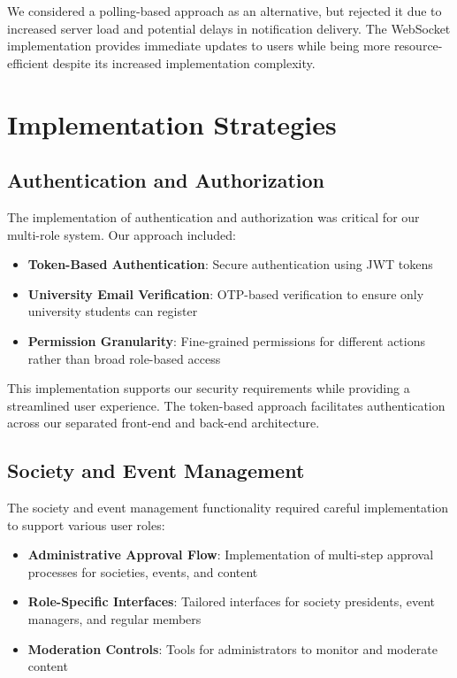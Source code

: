 We considered a polling-based approach as an alternative, but rejected it due to 
increased server load and potential delays in notification delivery. The WebSocket 
implementation provides immediate updates to users while being more resource-efficient 
despite its increased implementation complexity.

\section{Implementation Strategies}

\subsection{Authentication and Authorization}

The implementation of authentication and authorization was critical for our multi-role 
system. Our approach included:

\begin{itemize}
    \item \textbf{Token-Based Authentication}: Secure authentication using JWT tokens
    \item \textbf{University Email Verification}: OTP-based verification to ensure only 
    university students can register
    \item \textbf{Permission Granularity}: Fine-grained permissions for different actions 
    rather than broad role-based access
\end{itemize}

This implementation supports our security requirements while providing a streamlined user
experience. The token-based approach facilitates authentication across our separated 
front-end and back-end architecture.

\subsection{Society and Event Management}

The society and event management functionality required careful implementation to support
various user roles:

\begin{itemize}
    \item \textbf{Administrative Approval Flow}: Implementation of multi-step approval 
    processes for societies, events, and content
    \item \textbf{Role-Specific Interfaces}: Tailored interfaces for society presidents, 
    event managers, and regular members
    \item \textbf{Moderation Controls}: Tools for administrators to monitor and moderate 
    content
\end{itemize}

